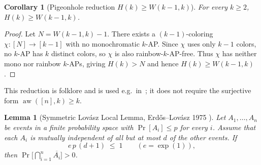 \documentclass[11pt,reqno,a4paper]{amsart}
\theoremstyle{plain}
\newtheorem{lemma}[theorem]{Lemma}
\newtheorem{corollary}[theorem]{Corollary}
\theoremstyle{definition}
\theoremstyle{remark}
\numberwithin{equation}{section}
\DeclareMathOperator{\aw}{aw}
\begin{document}
\begin{corollary}[Pigeonhole reduction $H(k)\ge W(k-1,k)$]
\label{cor:jlmr-to-W}
For every $k\ge 2$, $H(k)\ge W(k-1,k)$.
\end{corollary}

\begin{proof}
Let $N=W(k-1,k)-1$. There exists a $(k-1)$-coloring
$\chi:[N]\to[k-1]$ with no monochromatic $k$-AP. Since $\chi$ uses
only $k-1$ colors, no $k$-AP has $k$ distinct colors, so $\chi$ is
also rainbow-$k$-AP-free. Thus $\chi$ has neither mono nor rainbow
$k$-APs, giving $H(k)>N$ and hence $H(k)\ge W(k-1,k)$.
\end{proof}

This reduction is folklore and is used e.g.\ in~\cite[\S2]{BEHH2016};
it does not require the surjective form $\aw([n],k)\ge k$.

\begin{lemma}[Symmetric Lov\'asz Local Lemma, Erd\H{o}s--Lov\'asz 1975
\cite{ErdosLovasz1975}]
\label{lem:LLL}
Let $A_{1},\ldots,A_{n}$ be events in a finite probability space with
$\Pr[A_{i}]\le p$ for every $i$. Assume that each $A_{i}$ is mutually
independent of all but at most $d$ of the other events. If
\begin{equation}
e\,p\,(d+1)\;\le\;1 \qquad(e=\exp(1)),
\label{eq:lll-cond}
\end{equation}
then $\Pr\!\bigl[\bigcap_{i=1}^{n}\overline{A_{i}}\bigr]>0$.
\end{lemma}
\end{document}
